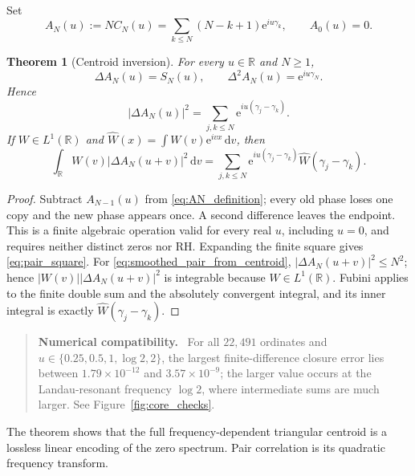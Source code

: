 \documentclass[11pt]{amsart}
\newtheorem{theorem}{Theorem}[section]
\theoremstyle{definition}
\theoremstyle{remark}
\newcommand{\dd}{\,\mathrm d}
\newcommand{\ee}{\mathrm e}
\newenvironment{numericalcheck}
{\begin{quote}\small\noindent\textbf{Numerical compatibility.}\ }{\end{quote}}
\begin{document}
Set
\begin{equation}\label{eq:AN_definition}
A_N(u):=NC_N(u)=\sum_{k\leq N}(N-k+1)\ee^{iu\gamma_k},
\qquad A_0(u)=0.
\end{equation}

\begin{theorem}[Centroid inversion]\label{thm:centroid_inversion}
For every $u\in\mathbb R$ and $N\geq1$,
\begin{equation}\label{eq:centroid_inversion}
\boxed{
\Delta A_N(u)=S_N(u),
\qquad
\Delta^2A_N(u)=\ee^{iu\gamma_N}.}
\end{equation}
Hence
\begin{equation}\label{eq:pair_square}
|\Delta A_N(u)|^2=\sum_{j,k\leq N}\ee^{iu(\gamma_j-\gamma_k)}.
\end{equation}
If $W\in L^1(\mathbb R)$ and
$\widehat W(x)=\int W(v)\ee^{ivx}\dd v$, then
\begin{equation}\label{eq:smoothed_pair_from_centroid}
\boxed{
\int_{\mathbb R}W(v)|\Delta A_N(u+v)|^2\dd v
=\sum_{j,k\leq N}\ee^{iu(\gamma_j-\gamma_k)}
\widehat W(\gamma_j-\gamma_k).}
\end{equation}
\end{theorem}

\begin{proof}
Subtract $A_{N-1}(u)$ from \eqref{eq:AN_definition}; every old phase loses one
copy and the new phase appears once.  A second difference leaves the endpoint.
This is a finite algebraic operation valid for every real $u$, including
$u=0$, and requires neither distinct zeros nor RH.  Expanding the finite square
gives \eqref{eq:pair_square}.  For \eqref{eq:smoothed_pair_from_centroid},
$|\Delta A_N(u+v)|^2\le N^2$; hence
$|W(v)||\Delta A_N(u+v)|^2$ is integrable because $W\in L^1(\mathbb R)$.
Fubini applies to the finite double sum and the absolutely convergent integral,
and its inner integral is exactly $\widehat W(\gamma_j-\gamma_k)$.
\end{proof}

\begin{numericalcheck}
For all $22{,}491$ ordinates and
$u\in\{0.25,0.5,1,\log2,2\}$, the largest finite-difference closure error lies
between $1.79\times10^{-12}$ and $3.57\times10^{-9}$; the larger value occurs
at the Landau-resonant frequency $\log2$, where intermediate sums are much
larger.  See Figure~\ref{fig:core_checks}.
\end{numericalcheck}

The theorem shows that the full frequency-dependent triangular centroid is a
lossless linear encoding of the zero spectrum.  Pair correlation is its
quadratic frequency transform.
\end{document}
